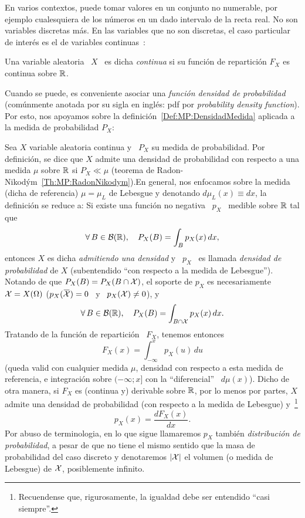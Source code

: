 
\label{Ssec:MP:VAContinua}

En  varios contextos,  puede  tomar valores  en  un conjunto  no numerable,  por
ejemplo cualesquiera de los n\'umeros en un dado intervalo de la recta real.  No
son variables  discretas m\'as. En las  variables que no son  discretas, el caso
particular de inter\'es es el de variables continuas~\cite{AthLah06, HogMck13}:
%
\begin{definicion}
  Una variable  aleatoria \  $X$ \ es  dicha {\it  continua} si su  funci\'on de
  repartici\'on  $F_X$ es  continua sobre  $\mathbb{R}$.
\end{definicion}

Cuando  se  puede,  es  conveniente  asociar  una  {\it  funci\'on  densidad  de
  probabilidad} (com\'unmente  anotada por  su sigla en  ingl\'es: pdf  por {\it
  probability   density   function}).   Por   esto,   nos   apoyamos   sobre   la
definici\'on~\ref{Def:MP:DensidadMedida}  aplicada a  la medida  de probabilidad
$P_X$:
%
\begin{definicion}
  Sea $X$ variable  aleatoria continua y \ $P_X$ su  medida de probabilidad. Por
  definici\'on, se dice que $X$  admite una densidad de probabilidad con respecto
  a   una  medida   $\mu$  sobre   $\mathbb{R}$  si   $P_X  \ll   \mu$   (teorema  de
  Radon-Nikod\'ym~\ref{Th:MP:RadonNikodym}).\newline En  general, nos enfocamos
  sobre la  medida (dicha de referencia)  $\mu = \mu_L$ de  Lebesgue y denotando
  $d\mu_L(x) \equiv dx$, la definici\'on se reduce a: Si existe una funci\'on no
  negativa \ $p_X$ \ medible sobre $\mathbb{R}$ tal que
  \[
  \forall \, B \in \mathcal{B}(\mathbb{R}), \quad P_X(B) = \int_B p_X(x) \, dx,
  \]
  entonces $X$  es dicha {\it  admitiendo una densidad}  y \ $p_X$ \  es llamada
  {\it densidad de probabilidad} de  $X$ (subentendido ``con respecto a la medida
  de Lebesgue'').  Notando de que $P_X(B) = P_X(B \cap \mathcal{X})$, el soporte de $p_X$
  es necesariamente $\mathcal{X} = X(\Omega)$ (\ie $p_X(\widebar{\X}) = 0$ \ y \ $p_X(\mathcal{X})
  \ne 0$), y
  \[
  \forall \, B \in \mathcal{B}(\mathbb{R}), \quad P_X(B) = \int_{B \cap \mathcal{X}} p_X(x) \, dx.
  \]
  Tratando de la funci\'on de repartici\'on \ $F_X$, tenemos entonces
  \[
  F_X(x) = \int_{-\infty}^x p_X(u) \, du
  \]
  (queda valid con cualquier medida $\mu$, densidad con respecto a esta medida de
  referencia,  e integraci\'on  sobre $(-\infty;  x]$ con  la  ``diferencial'' \
  $d\mu(x)$).  Dicho  de otra manera, si  $F_X$ es (continua  y) derivable sobre
  $\mathbb{R}$, por lo menos por partes, $X$ admite una densidad de probabilidad (con
  respecto a  la medida de Lebesgue)  y~\footnote{Recuendense que, rigurosamente,
    la igualdad debe ser entendido ``casi siempre''.}
  \[
  p_X(x) = \frac{d F_X(x)}{dx}.
  \]
  Por abuso  de terminologia,  en lo que  sigue llamaremos $p_X$  tambi\'en {\it
    distribuci\'on de  probabilidad}, a pesar de  que no tiene  el mismo sentido
  que la masa de probabilidad del  caso discreto y denotaremos $|\mathcal{X}|$ el volumen
  (o medida de Lebesgue) de $\mathcal{X}$, posiblemente infinito.
\end{definicion}
